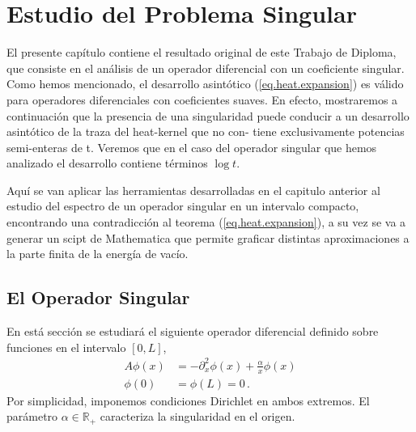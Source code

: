 \chapter{Estudio del Problema Singular}
{\label{cap.singular}}

El presente capítulo contiene el resultado original de este Trabajo de Diploma, que consiste en el análisis de un operador diferencial con un coeficiente singular. Como hemos mencionado, el desarrollo asintótico (\ref{eq.heat.expansion})
es válido para operadores diferenciales con coeficientes suaves. En efecto,
mostraremos a continuación que la presencia de una singularidad puede
conducir a un desarrollo asintótico de la traza del heat-kernel que no con-
tiene exclusivamente potencias semi-enteras de t. Veremos que
en el caso del operador singular que hemos analizado el desarrollo contiene
términos $\log t$.

Aquí se van aplicar las herramientas desarrolladas en el capitulo anterior
al estudio del espectro de un operador singular en un intervalo compacto,
encontrando una contradicción al teorema (\ref{eq.heat.expansion}), a su vez se va a generar un scipt de Mathematica que permite graficar distintas aproximaciones a
la parte finita de la energía de vacío.


\section{El Operador Singular}


En está sección se estudiará el siguiente operador diferencial definido sobre funciones en el intervalo $[0,L]$,
\begin{equation}
\begin{aligned}
    A \phi (x) &= - \partial ^2 _x  \phi(x) + \frac{\alpha}{x} \phi(x) \\[5pt]
    \phi(0) &= \phi(L) = 0 \, .
\end{aligned}
\label{operador}
\end{equation}
Por simplicidad, imponemos condiciones Dirichlet en ambos extremos. El parámetro $\alpha \in \mathbb{R _{+}}$ caracteriza la singularidad en el origen.


